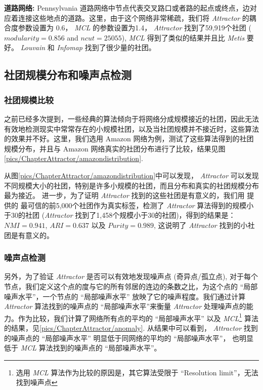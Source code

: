 \textbf{道路网络:} Pennsylvania 道路网络中节点代表交叉路口或者路的起点或终点，边对应着连接这些地点的道路。这里，由于这个网络非常稀疏，我们将 \emph{Attractor} 的耦合度参数设置为 0.6， \emph{MCL} 的参数设置为1.4， \emph{Attractor} 找到了59,919个社团 ($modularity = 0.856$ and $ncut = 25055$), \emph{MCL} 得到了类似的结果并且比 \emph{Metis} 要好。 \emph{Louvain} 和 \emph{Infomap} 找到了很少量的社团。

\subsection{社团规模分布和噪声点检测}
\subsubsection{社团规模比较}
之前已经多次提到，一些经典的算法倾向于将网络分成规模接近的社团，因此无法有效地检测现实中常常存在的小规模社团，以及当社团规模并不接近时，这些算法的效果并不好。这里，我们选用 Amazon 网络为例，测试了这些算法得到的社团规模分布，并且与 Amazon 网络真实的社团分布进行了比较，结果见图\ref{pics/ChapterAttractor/amazondistribution}.\par
从图\ref{pics/ChapterAttractor/amazondistribution}中可以发现， \emph{Attractor} 可以发现不同规模大小的社团，特别是许多小规模的社团，而且分布和真实的社团规模分布最为接近。 进一步，为了证明 \emph{Attractor} 找到的这些社团是有意义的，我们用  提供的 最可信的前5,000个社团作为真实标签，检测了 \emph{Attractor} 算法得到的规模小于30的社团 (\emph{Attractor} 找到了1,458个规模小于30的社团)，得到的结果是：$NMI = 0.941$, $ARI = 0.637$ 以及 $Purity = 0.989$, 这说明了 \emph{Attractor} 找到的小社团是有意义的。


\subsubsection{噪声点检测}
另外，为了验证 \emph{Attractor} 是否可以有效地发现噪声点 (奇异点/孤立点), 对于每个节点，我们定义这个点的度与它的所有邻居的连边的条数之比，为这个点的 ``局部噪声水平''，一个节点的 ``局部噪声水平'' 放映了它的噪声程度。我们通过计算 \emph{Attractor} 算法找到的噪声点的 ``局部噪声水平''来衡量 \emph{Attractor} 处理噪声点的能力。作为比较，我们计算了网络所有点的平均的 ``局部噪声水平'' 以及 \emph{MCL}\footnote{选用 \emph{MCL} 算法作为比较的原因是，其它算法受限于 ``Resolution limit''，无法找到噪声点} 算法的结果，见\ref{pics/ChapterAttractor/anomaly}. 从结果中可以看到， \emph{Attractor} 找到的噪声点的 ``局部噪声水平'' 明显低于同网络的平均的 ``局部噪声水平''， 也明显低于 \emph{MCL} 算法找到的噪声点的 ``局部噪声水平''。

